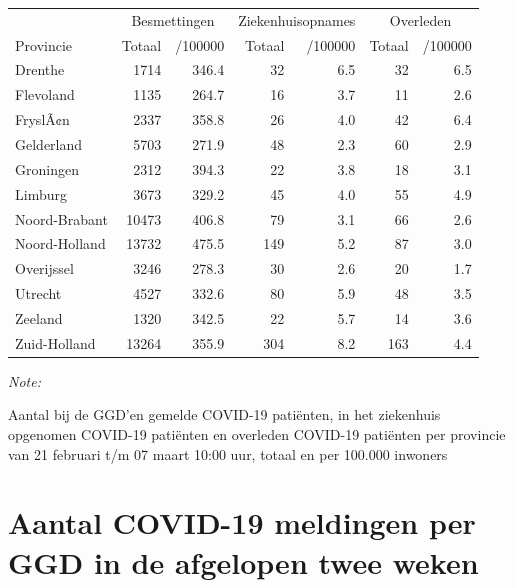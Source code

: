 \documentclass[
  english,
  man,floatsintext]{apa6}
\begin{document}
\begin{table}
\centering
\begin{threeparttable}
\begin{tabular}{lrrrrrr}
\toprule
\multicolumn{1}{c}{ } & \multicolumn{2}{c}{Besmettingen} & \multicolumn{2}{c}{Ziekenhuisopnames} & \multicolumn{2}{c}{Overleden} \\
\cmidrule(l{3pt}r{3pt}){2-3} \cmidrule(l{3pt}r{3pt}){4-5} \cmidrule(l{3pt}r{3pt}){6-7}
Provincie & Totaal & /100000 & Totaal & /100000 & Totaal & /100000\\
\midrule
Drenthe & 1714 & 346.4 & 32 & 6.5 & 32 & 6.5\\
Flevoland & 1135 & 264.7 & 16 & 3.7 & 11 & 2.6\\
FryslÃ¢n & 2337 & 358.8 & 26 & 4.0 & 42 & 6.4\\
Gelderland & 5703 & 271.9 & 48 & 2.3 & 60 & 2.9\\
Groningen & 2312 & 394.3 & 22 & 3.8 & 18 & 3.1\\
Limburg & 3673 & 329.2 & 45 & 4.0 & 55 & 4.9\\
Noord-Brabant & 10473 & 406.8 & 79 & 3.1 & 66 & 2.6\\
Noord-Holland & 13732 & 475.5 & 149 & 5.2 & 87 & 3.0\\
Overijssel & 3246 & 278.3 & 30 & 2.6 & 20 & 1.7\\
Utrecht & 4527 & 332.6 & 80 & 5.9 & 48 & 3.5\\
Zeeland & 1320 & 342.5 & 22 & 5.7 & 14 & 3.6\\
Zuid-Holland & 13264 & 355.9 & 304 & 8.2 & 163 & 4.4\\
\bottomrule
\end{tabular}
\begin{tablenotes}
\item \textit{Note: } 
\item Aantal bij de GGD’en gemelde COVID-19 patiënten, in het ziekenhuis opgenomen COVID-19 patiënten en overleden COVID-19 patiënten per provincie van 21 februari t/m 07 maart 10:00 uur, totaal en per 100.000 inwoners
\end{tablenotes}
\end{threeparttable}
\end{table}

\newpage

\hypertarget{aantal-covid-19-meldingen-per-ggd-in-de-afgelopen-twee-weken}{%
\section{Aantal COVID-19 meldingen per GGD in de afgelopen twee weken}\label{aantal-covid-19-meldingen-per-ggd-in-de-afgelopen-twee-weken}}
\end{document}
